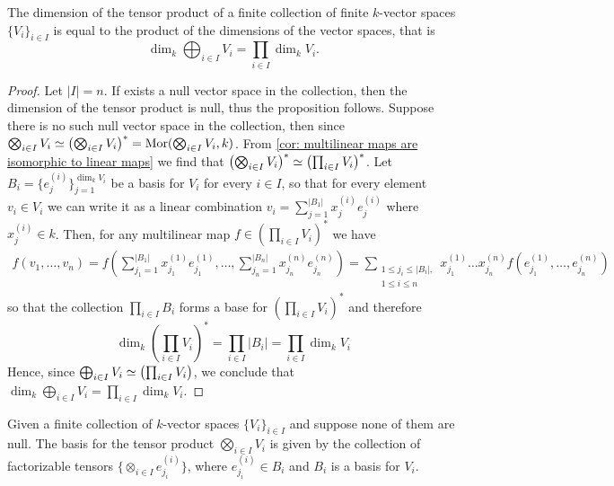 \begin{proposition}
    \label{prop: tensor product dimension}
    The dimension of the tensor product of a finite collection of finite
    \(k\)-vector spaces \(\{V_i\}_{i \in I}\) is equal to the product of the
    dimensions of the vector spaces, that is
    \[
        \dim_k \bigoplus_{i \in I} V_i = \prod_{i \in I} \dim_k V_i.
    \]
\end{proposition}

\begin{proof}
    Let \(|I| = n\). If exists a null vector space in the collection, then the
    dimension of the tensor product is null, thus the proposition follows. Suppose
    there is no such null vector space in the collection, then since
    \(\bigotimes_{i \in I} V_i \simeq \left( \bigotimes_{i \in I} V_i \right)^\ast =
    \operatorname{Mor}(\bigotimes_{i \in I} V_i, k)\). From \cref{cor: multilinear maps are
        isomorphic to linear maps} we find that \(\left( \bigotimes_{i \in I} V_i
    \right)^\ast \simeq \left( \prod_{i \in I} V_i \right)^\ast\). Let \(B_i =
    \{e_j^{(i)}\}_{j=1}^{\dim_k V_i}\) be a basis for \(V_i\) for every \(i \in
    I\), so that for every element \(v_i \in V_i\) we can write it as a linear
    combination \(v_i = \sum_{j=1}^{|B_1|} x_j^{(i)} e_j^{(i)}\) where
    \(x_j^{(i)} \in k\). Then, for any multilinear map \(f \in \left( \prod_{i \in
        I} V_i \right)^\ast\) we have
    \begin{align*}
        f(v_1, \dots, v_n)
        = f\left( \sum_{j_1=1}^{|B_1|} x_{j_1}^{(1)} e_{j_1}^{(1)}, \dots,
        \sum_{j_n=1}^{|B_n|} x_{j_n}^{(n)} e_{j_n}^{(n)} \right)
        = \sum_{\substack{1 \leq j_i \leq |B_i|, \\ 1 \leq i \leq n}}
        x_{j_1}^{(1)} \dots x_{j_n}^{(n)} f\left(e_{j_1}^{(1)}, \dots,
        e_{j_n}^{(n)}\right)
    \end{align*}
    so that the collection \(\prod_{i \in I} B_i\) forms a base for \(\left(
    \prod_{i \in I} V_i \right)^\ast\) and therefore
    \[
        \dim_k \left( \prod_{i \in I} V_i \right)^\ast = \prod_{i \in I} |B_i| =
        \prod_{i \in I} \dim_k V_i
    \]
    Hence, since \(\bigoplus_{i \in I} V_i \simeq \left( \prod_{i \in I} V_i
    \right)\), we conclude that \(\dim_k \bigoplus_{i \in I} V_i = \prod_{i \in I}
    \dim_k V_i\).
\end{proof}

\begin{lemma}\label{lem: tensor basis}
    Given a finite collection of \(k\)-vector spaces \(\{V_i\}_{i \in I}\) and
    suppose none of them are null. The basis for the tensor product
    \(\bigotimes_{i \in I} V_i\) is given by the collection of factorizable
    tensors \(\{\otimes_{i \in I} e_{j_i}^{(i)}\}\), where \(e_{j_i}^{(i)} \in
    B_i\) and \(B_i\) is a basis for \(V_i\).
\end{lemma}

